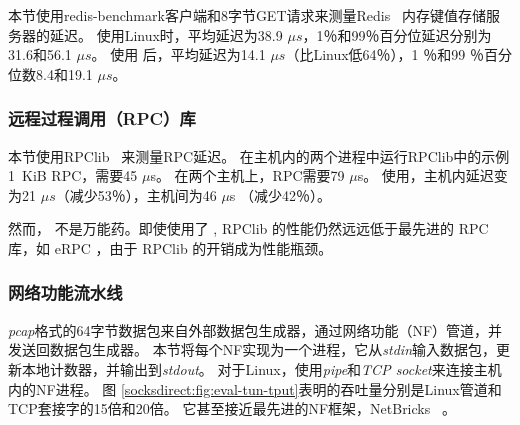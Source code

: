 本节使用redis-benchmark客户端和8字节GET请求来测量Redis~ \cite {redis} 内存键值存储服务器的延迟。
使用Linux时，平均延迟为38.9 $ \mu s $，1％和99％百分位延迟分别为31.6和56.1 $ \mu s $。
使用\sys {} 后，平均延迟为14.1 $ \mu s $（比Linux低64％），1 ％和99 ％百分位数8.4和19.1 $ \mu s$。







\subsubsection{远程过程调用（RPC）库}

本节使用RPClib~ \cite {rpclib}来测量RPC延迟。
在主机内的两个进程中运行RPClib中的示例1~KiB RPC，需要45 $ \mu $s。 在两个主机上，RPC需要79 $ \mu$s。
使用\sys {}，主机内延迟变为21 $ \mu s $（减少53％），主机间为46 $ \mu$s （减少42％）。

然而，\sys{} 不是万能药。即使使用了 \libipc{}, RPClib 的性能仍然远远低于最先进的 RPC 库，如 eRPC \cite{kalia2018datacenter}，由于 RPClib 的开销成为性能瓶颈。

\subsubsection{网络功能流水线}

\emph {pcap}格式的64字节数据包来自外部数据包生成器，通过网络功能（NF）管道，并发送回数据包生成器。
本节将每个NF实现为一个进程，它从\emph {stdin}输入数据包，更新本地计数器，并输出到\emph {stdout}。
对于Linux，使用\emph {pipe}和\emph {TCP socket}来连接主机内的NF进程。
图 \ref {socksdirect:fig:eval-tun-tput}表明\sys {}的吞吐量分别是Linux管道和TCP套接字的15倍和20倍。
它甚至接近最先进的NF框架，NetBricks~ \cite {panda2016netbricks}。

